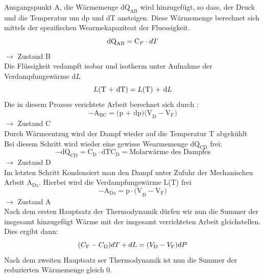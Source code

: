 Ausgangspunkt A, die Wärmemenge $\text{dQ}_\text{AB} $ wird hinzugefügt, so dass, der Druck und die Temperatur um dp und dT ansteigen.
Diese Wärmemenge berechnet sich mittels der spezifischen Wearmekapaziteat der Fluessigkeit.
\begin{equation}
    \text{dQ}_\text{AB}= \text{C}_F \cdot dT \nonumber\\
\end{equation}
$\rightarrow$ Zustand B\\
Die Flüssigkeit vedampft isobar und isotherm unter Aufnahme der Verdampfungswärme d$L$\\
\begin{equation}
L\text{(T + dT)} = L\text{(T) + d}L\nonumber\\
\end{equation}
Die in diesem Prozess verichtete Arbeit berechnet sich durch :\\
\begin{equation}
   - \text{A}_\text{BC} = \text{(p + dp)(V}_\text{D} - \text{V}_\text{F}\text{)} 
\end{equation}
$\rightarrow$ Zustand C\\
Durch Wärmeentzug wird der Dampf wieder auf die Temperatur T abgekühlt \\
Bei diesem Schritt wird wieder eine gewisse Wearmemenge $\text{dQ}_\text{CD}$ frei:
\begin{equation}
 -\text{dQ}_\text{CD} = \text{C}_\text{D}\cdot \text{dT} \text{C}_\text{D} = \text{Molarwärme des Dampfes}   
\end{equation}
$\rightarrow$ Zustand D\\
Im letzten Schritt Kondensiert man den Dampf unter Zufuhr der Mechanischen Arbeit $\text{A}_\text{Da}$.
Hierbei wird die Verdampfungswärme L(T) frei\\ 
\begin{equation}
    -\text{A}_\text{Da}= \text{p}\cdot\text{(V}_\text{D} - \text{V}_\text{F}\text{)}
\end{equation}
$\rightarrow$ Zustand A\\

Nach dem ersten Hauptsatz der Thermodynamik dürfen wir nun die Summer der insgesamt hinzugefügt Wärme mit der insgesamt 
verrichteten Arbeit gleichstellen. Dies ergibt dann:        
\begin{equation}
    (C_\text{F}-C_\text{D})dT + dL = (V_\text{D}-V_\text{F})dP\\
    \label{eqn:wearme=Arbeit}
\end{equation}
Nach dem zweiten Hauptsatz ser Thermodynamik ist nun die Summer der reduzierten Wärmemenge gleich 0.


